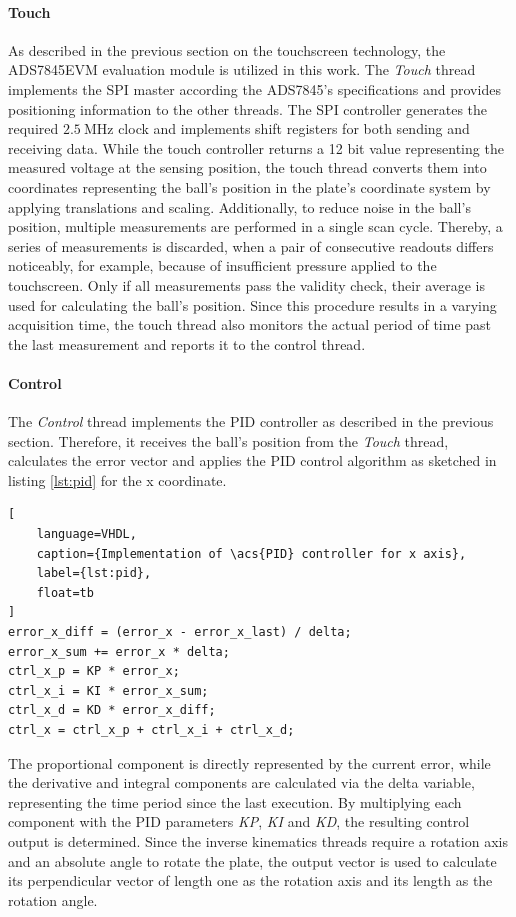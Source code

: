 \paragraph{Touch} As described in the previous section on the touchscreen
technology, the ADS7845EVM evaluation module is utilized in this work. The
\emph{Touch} thread implements the \ac{SPI} master according the ADS7845's
specifications and provides positioning information to the other threads. The
\ac{SPI} controller generates the required $\SI{2.5}{\mega\hertz}$ clock and
implements shift registers for both sending and receiving data. While the
touch controller returns a 12 bit value representing the measured voltage at
the sensing position, the touch thread converts them into coordinates
representing the ball's position in the plate's coordinate system by applying
translations and scaling. Additionally, to reduce noise in the ball's
position, multiple measurements are performed in a single scan cycle. Thereby,
a series of measurements is discarded, when a pair of consecutive readouts
differs noticeably, for example, because of insufficient pressure applied to
the touchscreen. Only if all measurements pass the validity check, their
average is used for calculating the ball's position. Since this procedure
results in a varying acquisition time, the touch thread also monitors the
actual period of time past the last measurement and reports it to the control
thread.

\paragraph{Control} The \emph{Control} thread implements the \ac{PID}
controller as described in the previous section. Therefore, it receives the
ball's position from the \emph{Touch} thread, calculates the error vector and
applies the \ac{PID} control algorithm as sketched in listing \ref{lst:pid}
for the x coordinate.
\begin{lstlisting}[
	language=VHDL,
	caption={Implementation of \acs{PID} controller for x axis},
	label={lst:pid},
	float=tb
]
error_x_diff = (error_x - error_x_last) / delta;
error_x_sum += error_x * delta;
ctrl_x_p = KP * error_x;
ctrl_x_i = KI * error_x_sum;
ctrl_x_d = KD * error_x_diff;
ctrl_x = ctrl_x_p + ctrl_x_i + ctrl_x_d;
\end{lstlisting}
The proportional component is directly represented by the current error, while
the derivative and integral components are calculated via the delta variable,
representing the time period since the last execution. By multiplying each
component with the \ac{PID} parameters \emph{KP}, \emph{KI} and \emph{KD}, the
resulting control output is determined. Since the inverse kinematics threads
require a rotation axis and an absolute angle to rotate the plate, the output
vector is used to calculate its perpendicular vector of length one as the
rotation axis and its length as the rotation angle.

